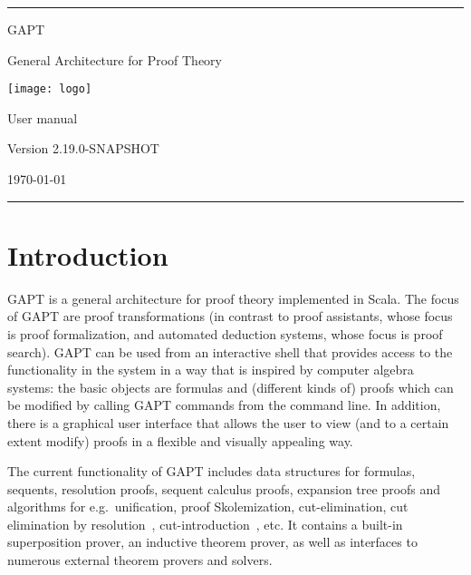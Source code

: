 \documentclass[a4paper,11pt]{book}
\begin{document}
\begin{titlepage}
  \begin{center}

    \hrule

    \vspace*{20mm}

    {\Huge GAPT}

    \vspace*{5mm}

    {\huge General Architecture for Proof Theory}

    \vspace*{20mm}

    \texttt{[image: logo]}

    \vspace*{20mm}

    {\Huge User manual}

    \vspace*{10mm}
    {\Large Version 2.19.0-SNAPSHOT}
    \vspace*{10mm}

    {\Large \today}

    \vspace*{20mm}

    \hrule
  \end{center}

\end{titlepage}

\listoffixmes

\setcounter{tocdepth}{1}
\tableofcontents

\chapter{Introduction}

GAPT is a general architecture for proof theory implemented in Scala.
The focus of GAPT are proof transformations (in contrast to proof assistants,
whose focus is proof formalization, and automated deduction systems, whose focus
is proof search).  GAPT can be used from an interactive shell that provides access to the functionality
in the system in a way that is inspired by computer algebra systems: the basic
objects are formulas and (different kinds of) proofs which can be modified
by calling GAPT commands from the command line. In addition, there
is a graphical user interface that allows the user to view (and to a certain
extent modify) proofs in a flexible and visually appealing way.

The current functionality of GAPT includes data structures for formulas,
sequents, resolution proofs, sequent calculus proofs, expansion tree proofs and
algorithms for e.g.\ unification, proof Skolemization, cut-elimination, cut
elimination by resolution~\cite{Baaz00CutElimination},
cut-introduction~\cite{Hetzl2012}, etc. It contains a built-in superposition
prover, an inductive theorem prover, as well as interfaces to numerous external
theorem provers and solvers.
\end{document}
